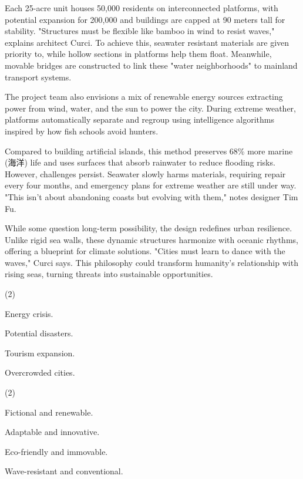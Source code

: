 \documentclass{英语试卷}
\begin{document}
\par Each 25-acre unit houses 50,000 residents on interconnected platforms, with potential expansion for 200,000 and buildings are capped at 90 meters tall for stability. "Structures must be flexible like bamboo in wind to resist waves," explains architect Curci. To achieve this, seawater resistant materials are given priority to, while hollow sections in platforms help them float. Meanwhile, movable bridges are constructed to link these "water neighborhoods" to mainland transport systems.\par
\par The project team also envisions a mix of renewable energy sources extracting power from wind, water, and the sun to power the city. During extreme weather, platforms automatically separate and regroup using intelligence algorithms inspired by how fish schools avoid hunters.\par
\par Compared to building artificial islands, this method preserves 68\% more marine (海洋) life and uses surfaces that absorb rainwater to reduce flooding risks. However, challenges persist. Seawater slowly harms materials, requiring repair every four months, and emergency plans for extreme weather are still under way. "This isn’t about abandoning coasts but evolving with them," notes designer Tim Fu.\par
\par While some question long-term possibility, the design redefines urban resilience. Unlike rigid sea walls, these dynamic structures harmonize with oceanic rhythms, offering a blueprint for climate solutions. "Cities must learn to dance with the waves," Curci says. This philosophy could transform humanity's relationship with rising seas, turning threats into sustainable opportunities.\par
{}
\begin{choices}(2)
  \item Energy crisis.
  \item Potential disasters.
  \item Tourism expansion.
  \item Overcrowded cities.
\end{choices}
\begin{choices}(2)
  \item Fictional and renewable.
  \item Adaptable and innovative.
  \item Eco-friendly and immovable.
  \item Wave-resistant and conventional.
\end{choices}
\end{document}
